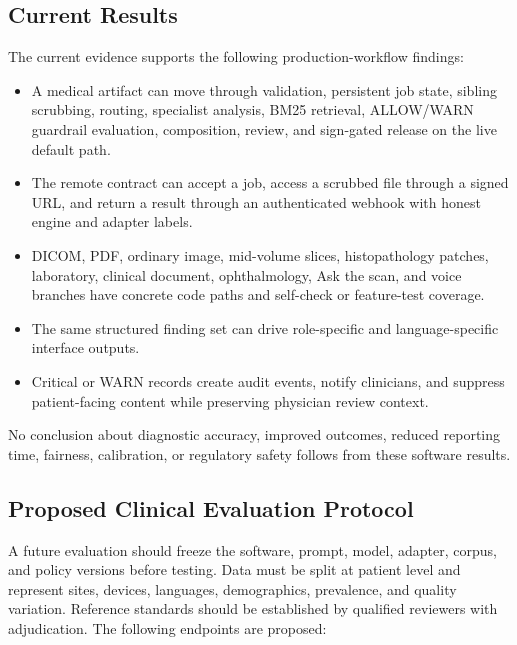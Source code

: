 \documentclass[conference]{IEEEtran}
\begin{document}
\subsection{Current Results}

The current evidence supports the following production-workflow findings:

\begin{itemize}
    \item A medical artifact can move through validation, persistent job state, sibling scrubbing, routing, specialist analysis, BM25 retrieval, ALLOW/WARN guardrail evaluation, composition, review, and sign-gated release on the live default path.
    \item The remote contract can accept a job, access a scrubbed file through a signed URL, and return a result through an authenticated webhook with honest engine and adapter labels.
    \item DICOM, PDF, ordinary image, mid-volume slices, histopathology patches, laboratory, clinical document, ophthalmology, Ask the scan, and voice branches have concrete code paths and self-check or feature-test coverage.
    \item The same structured finding set can drive role-specific and language-specific interface outputs.
    \item Critical or WARN records create audit events, notify clinicians, and suppress patient-facing content while preserving physician review context.
\end{itemize}

No conclusion about diagnostic accuracy, improved outcomes, reduced reporting time, fairness, calibration, or regulatory safety follows from these software results.

\subsection{Proposed Clinical Evaluation Protocol}

A future evaluation should freeze the software, prompt, model, adapter, corpus, and policy versions before testing. Data must be split at patient level and represent sites, devices, languages, demographics, prevalence, and quality variation. Reference standards should be established by qualified reviewers with adjudication. The following endpoints are proposed:
\end{document}

